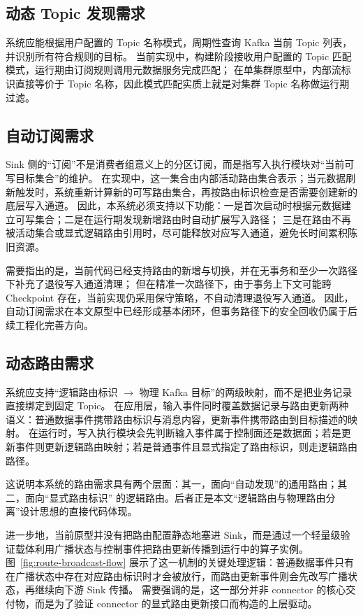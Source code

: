 \subsection{动态 Topic 发现需求}

系统应能根据用户配置的 Topic 名称模式，周期性查询 Kafka 当前 Topic 列表，并识别所有符合规则的目标。
当前实现中，构建阶段接收用户配置的 Topic 匹配模式，运行期由订阅规则调用元数据服务完成匹配；
在单集群原型中，内部流标识直接等价于 Topic 名称，因此模式匹配实质上就是对集群 Topic 名称做运行期过滤。

\subsection{自动订阅需求}

Sink 侧的“订阅”不是消费者组意义上的分区订阅，而是指写入执行模块对“当前可写目标集合”的维护。
在实现中，这一集合由内部活动路由集合表示；当元数据刷新触发时，系统重新计算新的可写路由集合，再按路由标识检查是否需要创建新的底层写入通道。
因此，本系统必须支持以下功能：一是首次启动时根据元数据建立可写集合；二是在运行期发现新增路由时自动扩展写入路径；
三是在路由不再被活动集合或显式逻辑路由引用时，尽可能释放对应写入通道，避免长时间累积陈旧资源。

需要指出的是，当前代码已经支持路由的新增与切换，并在无事务和至少一次路径下补充了退役写入通道清理；
但在精准一次路径下，由于事务上下文可能跨 Checkpoint 存在，当前实现仍采用保守策略，不自动清理退役写入通道。
因此，自动订阅需求在本文原型中已经形成基本闭环，但事务路径下的安全回收仍属于后续工程化完善方向。

\subsection{动态路由需求}

系统应支持“逻辑路由标识 $\to$ 物理 Kafka 目标”的两级映射，而不是把业务记录直接绑定到固定 Topic。
在应用层，输入事件同时覆盖数据记录与路由更新两种语义：普通数据事件携带路由标识与消息内容，更新事件携带路由到目标描述的映射。
在运行时，写入执行模块会先判断输入事件属于控制面还是数据面；若是更新事件则更新逻辑路由映射；若是普通事件且显式指定了路由标识，则走逻辑路由路径。

这说明本系统的路由需求具有两个层面：其一，面向“自动发现”的通用路由；其二，面向“显式路由标识”
的逻辑路由。后者正是本文“逻辑路由与物理路由分离”设计思想的直接代码体现。

进一步地，当前原型并没有把路由配置静态地塞进 Sink，而是通过一个轻量级验证载体利用广播状态与控制事件把路由更新传播到运行中的算子实例。
图~\ref{fig:route-broadcast-flow} 展示了这一机制的关键处理逻辑：普通数据事件只有在广播状态中存在对应路由标识时才会被放行，而路由更新事件则会先改写广播状态，再继续向下游 Sink 传播。
需要强调的是，这一部分并非 connector 的核心交付物，而是为了验证 connector 的显式路由更新接口而构造的上层驱动。

